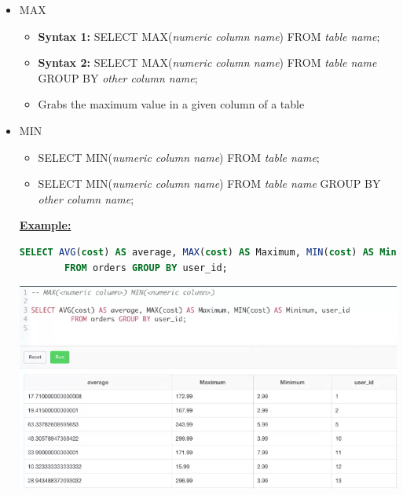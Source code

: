 \documentclass[12pt]{article}
\begin{document}
\begin{itemize}
    \item MAX
    \begin{itemize}
        \item \textbf{Syntax 1:} SELECT MAX(\textit{numeric column name}) FROM \textit{table name};
        \item \textbf{Syntax 2:} SELECT MAX(\textit{numeric column name}) FROM \textit{table name} GROUP BY \textit{other column name};
        \item Grabs the maximum value in a given column of a table
    \end{itemize}
    \item MIN
    \begin{itemize}
        \item SELECT MIN(\textit{numeric column name}) FROM \textit{table name};
        \item SELECT MIN(\textit{numeric column name}) FROM \textit{table name} GROUP BY \textit{other column name};
    \end{itemize}

    \bigskip

    \underline{\textbf{Example:}}

    \bigskip

    \begin{lstlisting}[language=SQL]
    SELECT AVG(cost) AS average, MAX(cost) AS Maximum, MIN(cost) AS Minimum, user_id,
        FROM orders GROUP BY user_id;
    \end{lstlisting}

    \bigskip

    \begin{center}
    \includegraphics[width=\linewidth]{images/part_3_notes_4.png}
    \end{center}
\end{itemize}
\end{document}
